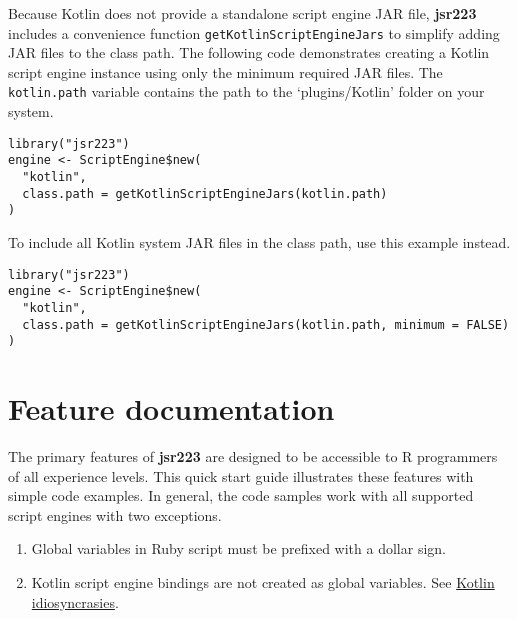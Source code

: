 \documentclass[
article,
11pt, %
a4paper, %
oneside, %
headinclude,footinclude, %
]{scrartcl}
\theoremstyle{definition} %
\theoremstyle{plain} %
\theoremstyle{remark} %
\newcommand{\pkg}[1]{\textbf{#1}}
\newcommand{\code}[1]{\texttt{#1}}
\newcommand{\file}[1]{{`\normalfont\textsf{#1}'}}
\newcommand{\samp}[1]{{`\normalfont\texttt{#1}'}}
\begin{document}
Because Kotlin does not provide a standalone script engine JAR file, \pkg{jsr223} includes a convenience function \code{getKotlinScriptEngineJars} to simplify adding JAR files to the class path. The following code demonstrates creating a Kotlin script engine instance using only the minimum required JAR files. The \code{kotlin.path} variable contains the path to the \file{plugins/Kotlin} folder on your system.

\begin{verbatim}
library("jsr223")
engine <- ScriptEngine$new(
  "kotlin",
  class.path = getKotlinScriptEngineJars(kotlin.path)
)
\end{verbatim}
To include all Kotlin system JAR files in the class path, use this example instead.

\begin{verbatim}
library("jsr223")
engine <- ScriptEngine$new(
  "kotlin",
  class.path = getKotlinScriptEngineJars(kotlin.path, minimum = FALSE)
)
\end{verbatim}


\hypertarget{feature-documentation}{}
\section{Feature documentation}

The primary features of \pkg{jsr223} are designed to be accessible to R programmers of all experience levels. This quick start guide illustrates these features with simple code examples. In general, the code samples work with all supported script engines with two exceptions.

\begin{enumerate}
\item Global variables in Ruby script must be prefixed with a dollar sign.
\item Kotlin script engine bindings are not created as global variables. See \hyperlink{kotlin-idiosyncrasies}{Kotlin idiosyncrasies}.
\end{enumerate}
\end{document}
